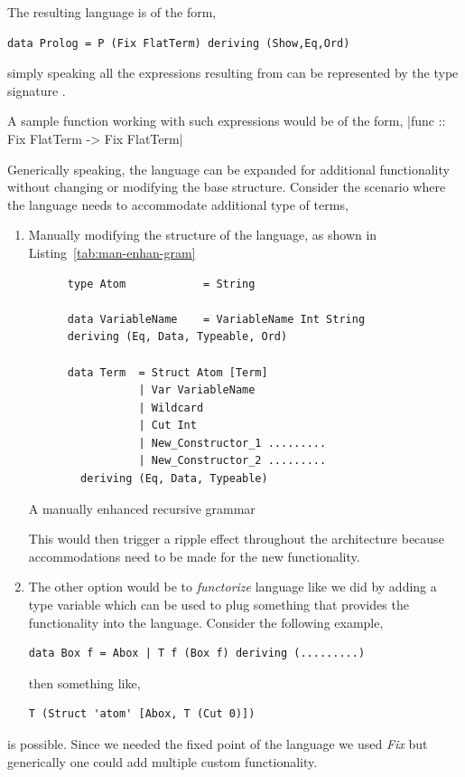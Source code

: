 \documentclass[thesis-solanki.tex]{subfiles}
\begin{document}
The resulting language is of the form,
\begin{verbatim}
data Prolog = P (Fix FlatTerm) deriving (Show,Eq,Ord)
\end{verbatim}
%
simply speaking all the expressions resulting from  can be represented  by the type signature .

A sample function working with such expressions would be of the form,
|func :: Fix FlatTerm -> Fix FlatTerm|


Generically speaking, the language can be expanded for additional functionality without changing or modifying the base structure. Consider
the scenario where the language needs to accommodate additional type of terms,

\begin{enumerate}
\item Manually modifying the structure of the language, as shown in Listing~\ref{tab:man-enhan-gram}
  \begin{code-list}[H]
    \begin{verbatim}
      type Atom            = String

      data VariableName    = VariableName Int String
      deriving (Eq, Data, Typeable, Ord)

      data Term  = Struct Atom [Term]
                 | Var VariableName
                 | Wildcard
                 | Cut Int
                 | New_Constructor_1 .........
                 | New_Constructor_2 .........
        deriving (Eq, Data, Typeable)
    \end{verbatim}
    \caption{A manually enhanced recursive grammar}
    \label{tab:man-enhan-gram}
  \end{code-list}

This would then trigger a ripple effect throughout the architecture because accommodations need to be made for the new functionality.

\item The other option would be to \textit{functorize} language like we did by adding a type variable which can be used to plug something that provides the functionality into the language.
Consider the following example,

\begin{verbatim}
data Box f = Abox | T f (Box f) deriving (.........)
\end{verbatim}

then something like,
\begin{verbatim}
T (Struct 'atom' [Abox, T (Cut 0)])
\end{verbatim}
\end{enumerate}
is possible. Since we needed the fixed point of the language we used \textit{Fix} but generically one could add multiple custom
functionality.
\end{document}
